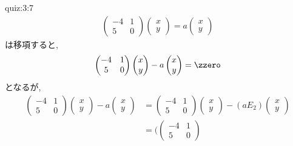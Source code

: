 \begin{answerof}{quiz:3:7} 
  \begin{align*}
    \begin{pmatrix}-4&1\\5&0\end{pmatrix}
    \begin{pmatrix}x\\y\end{pmatrix}
      =
      a\begin{pmatrix}x\\y\end{pmatrix}
  \end{align*}
  は移項すると,
  \begin{align*}
    \begin{pmatrix}-4&1\\5&0\end{pmatrix}
      \begin{pmatrix}x\\y\end{pmatrix}
        -
        a\begin{pmatrix}x\\y\end{pmatrix}
      =\zzero
  \end{align*}
  となるが,
  \begin{align*}
    \begin{pmatrix}-4&1\\5&0\end{pmatrix}
      \begin{pmatrix}x\\y\end{pmatrix}
        -
        a\begin{pmatrix}x\\y\end{pmatrix}
        &=
    \begin{pmatrix}-4&1\\5&0\end{pmatrix}
      \begin{pmatrix}x\\y\end{pmatrix}
        -
        (aE_2)\begin{pmatrix}x\\y\end{pmatrix}\\
        &=
        (\begin{pmatrix}-4&1\\5&0\end{pmatrix}

\end{align*}
\end{answerof}
